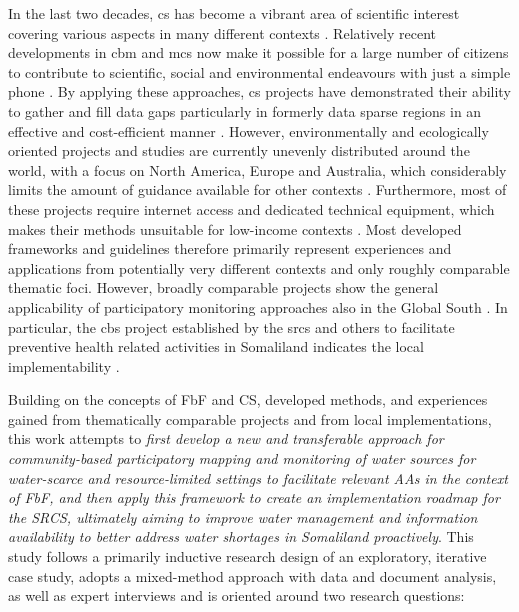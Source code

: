 In the last two decades, \acrfull{cs} has become a vibrant area of scientific interest covering various aspects in many different contexts \autocite{kirschkeCitizenScienceProjects2022,kullenbergWhatCitizenScience2016}. Relatively recent developments in \acrlong{cbm} and \acrlong{mcs} now make it possible for a large number of citizens to contribute to scientific, social and environmental endeavours with just a simple phone \autocite{butteFrameworkWaterSecurity2022}. By applying these approaches, \acrshort{cs} projects have demonstrated their ability to gather and fill data gaps particularly in formerly data sparse regions in an effective and cost-efficient manner \autocite{butteFrameworkWaterSecurity2022,lackstromBackyardHydroclimatologyCitizen2022,weeserCitizenSciencePioneers2018a}. However, environmentally and ecologically oriented projects and studies are currently unevenly distributed around the world, with a focus on North America, Europe and Australia, which considerably limits the amount of guidance available for other contexts \autocite{kirschkeCitizenScienceProjects2022, koehlerCitizenParticipationCollaborative2008, livinglakescanadaElevatingCommunityBased2018}. Furthermore, most of these projects require internet access and dedicated technical equipment, which makes their methods unsuitable for low-income contexts \autocite{fienenSocialWaterCrowdsourcing2012a,lackstromBackyardHydroclimatologyCitizen2022,lowryGrowingPainsCrowdsourced2019}.\newline
Most developed frameworks and guidelines therefore primarily represent experiences and applications from potentially very different contexts and only roughly comparable thematic foci. However, broadly comparable projects show the general applicability of participatory monitoring approaches also in the Global South \autocite{gualazziniEWEAEarlyWarning2021,ifrcCommunityBasedSurveillanceGuiding2017,ochaANTICIPATORYACTIONPLAN2020,weeserCitizenSciencePioneers2018a}. In particular, the \acrlong{cbs} project established by the \acrshort{srcs} and others to facilitate preventive health related activities in Somaliland indicates the local implementability \autocite{ifrcCommunityBasedSurveillanceGuiding2017,scrsFeasibilityStudyPotential2022}.\newline

Building on the concepts of FbF and CS, developed methods, and experiences gained from thematically comparable projects and from local implementations, this work attempts to \textit{first develop a new and transferable approach for community-based participatory mapping and monitoring of water sources for water-scarce and resource-limited settings to facilitate relevant AAs in the context of FbF, and then apply this framework to create an implementation roadmap for the SRCS, ultimately aiming to improve water management and information availability to better address water shortages in Somaliland proactively}.\newline
This study follows a primarily inductive research design of an exploratory, iterative case study, adopts a mixed-method approach with data and document analysis, as well as expert interviews and is oriented around two research questions:


